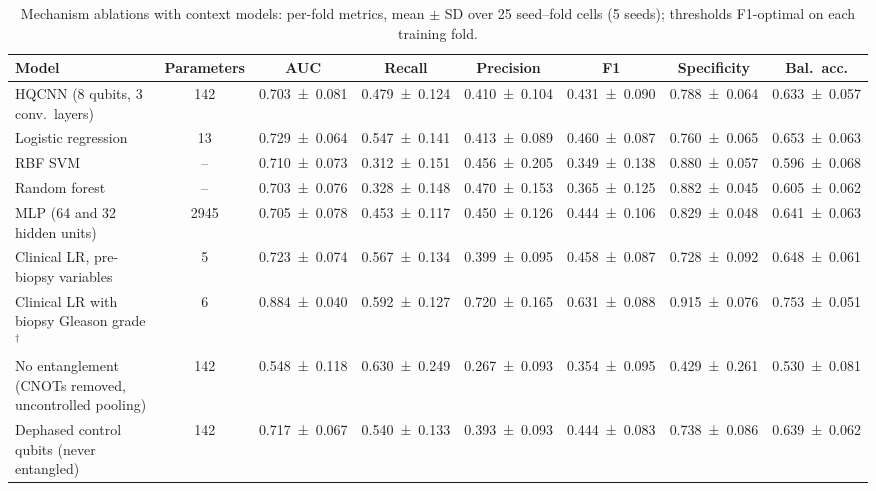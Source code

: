 \begin{table}[tbp]
\centering
\caption{Mechanism ablations with context models: per-fold metrics, mean $\pm$ SD over 25 seed--fold cells (5 seeds); thresholds F1-optimal on each training fold.}
\label{tab:s_p2_cv}
\scriptsize\setlength{\tabcolsep}{3pt}
\begin{tabular}{>{\raggedright\arraybackslash}p{3.6cm}ccccccc}
\toprule
Model & Parameters & AUC & Recall & Precision & F1 & Specificity & Bal.\ acc. \\
\midrule
HQCNN (8 qubits, 3 conv.\ layers) & \num{142} & \num{0.703 \pm 0.081} & \num{0.479 \pm 0.124} & \num{0.410 \pm 0.104} & \num{0.431 \pm 0.090} & \num{0.788 \pm 0.064} & \num{0.633 \pm 0.057} \\
Logistic regression & \num{13} & \num{0.729 \pm 0.064} & \num{0.547 \pm 0.141} & \num{0.413 \pm 0.089} & \num{0.460 \pm 0.087} & \num{0.760 \pm 0.065} & \num{0.653 \pm 0.063} \\
RBF SVM & -- & \num{0.710 \pm 0.073} & \num{0.312 \pm 0.151} & \num{0.456 \pm 0.205} & \num{0.349 \pm 0.138} & \num{0.880 \pm 0.057} & \num{0.596 \pm 0.068} \\
Random forest & -- & \num{0.703 \pm 0.076} & \num{0.328 \pm 0.148} & \num{0.470 \pm 0.153} & \num{0.365 \pm 0.125} & \num{0.882 \pm 0.045} & \num{0.605 \pm 0.062} \\
MLP (64 and 32 hidden units) & \num{2945} & \num{0.705 \pm 0.078} & \num{0.453 \pm 0.117} & \num{0.450 \pm 0.126} & \num{0.444 \pm 0.106} & \num{0.829 \pm 0.048} & \num{0.641 \pm 0.063} \\
Clinical LR, pre-biopsy variables & \num{5} & \num{0.723 \pm 0.074} & \num{0.567 \pm 0.134} & \num{0.399 \pm 0.095} & \num{0.458 \pm 0.087} & \num{0.728 \pm 0.092} & \num{0.648 \pm 0.061} \\
Clinical LR with biopsy Gleason grade$^{\dagger}$ & \num{6} & \num{0.884 \pm 0.040} & \num{0.592 \pm 0.127} & \num{0.720 \pm 0.165} & \num{0.631 \pm 0.088} & \num{0.915 \pm 0.076} & \num{0.753 \pm 0.051} \\
No entanglement (CNOTs removed, uncontrolled pooling) & \num{142} & \num{0.548 \pm 0.118} & \num{0.630 \pm 0.249} & \num{0.267 \pm 0.093} & \num{0.354 \pm 0.095} & \num{0.429 \pm 0.261} & \num{0.530 \pm 0.081} \\
Dephased control qubits (never entangled) & \num{142} & \num{0.717 \pm 0.067} & \num{0.540 \pm 0.133} & \num{0.393 \pm 0.093} & \num{0.444 \pm 0.083} & \num{0.738 \pm 0.086} & \num{0.639 \pm 0.062} \\

\end{tabular}
\end{table}
